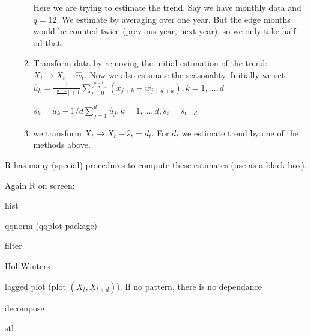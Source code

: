 \documentclass[12pt,a4paper]{amsart}
\theoremstyle{definition} %
\theoremstyle{plain} %
\begin{document}
\begin{enumerate}
\begin{enumerate}
Here we are trying to estimate the trend. Say we have monthly data and $q = 12$. We estimate by averaging over one year. But the edge months would be counted twice (previous year, next year), so we only take half od that. 

\item Transform data by removing the initial estimation of the trend: $X_t \rightarrow X_t - \hat{w}_t$.
Now we also estimate the seasonality. Initially we set $\hat{u}_k = \frac{1}{ \lfloor\frac{n-k}{d}\rfloor + 1 } \sum_{j=0}^{\lfloor\frac{n-k}{d}\rfloor} (x_{j+k} - \hat{w}_{j+d+k}), k=1,\dots, d$

$\hat{s}_k = \hat{u}_k - 1/d \sum_{j=1}^d \hat{u}_j, k=1, \dots, d, \hat{s}_t = \hat{s}_{t-d}$ 

\item we transform $X_t \rightarrow X_t - \hat{s}_t = d_t$. For $d_t$ we estimate trend by one of the methods above. 

\end{enumerate}  
\end{enumerate}


R has many (special) procedures to compute these estimates (use as a black box). 


\vskip0.5cm

Again R on screen:

hist

qqnorm (qqplot package)

filter

HoltWinters

lagged plot (plot $(X_t, X_{t+d})$). If no pattern, there is no dependance

decompose

stl
\end{document}
